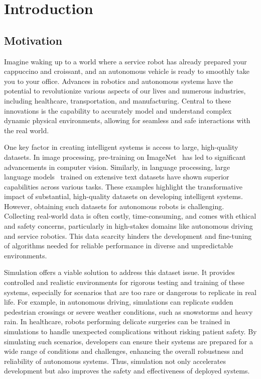 \chapter{Introduction}

\section{Motivation}

Imagine waking up to a world where a service robot has already prepared your cappuccino and croissant, and an autonomous vehicle is ready to smoothly take you to your office. Advances in robotics and autonomous systems have the potential to revolutionize various aspects of our lives and numerous industries, including healthcare, transportation, and manufacturing. Central to these innovations is the capability to accurately model and understand complex dynamic physical environments, allowing for seamless and safe interactions with the real world.

One key factor in creating intelligent systems is access to large, high-quality datasets. In image processing, pre-training on ImageNet~\cite{deng2009imagenet} has led to significant advancements in computer vision. Similarly, in language processing, large language models~\cite{radford2018improving} trained on extensive text datasets have shown superior capabilities across various tasks. These examples highlight the transformative impact of substantial, high-quality datasets on developing intelligent systems. However, obtaining such datasets for autonomous robots is challenging. Collecting real-world data is often costly, time-consuming, and comes with ethical and safety concerns, particularly in high-stakes domains like autonomous driving and service robotics. This data scarcity hinders the development and fine-tuning of algorithms needed for reliable performance in diverse and unpredictable environments.

Simulation offers a viable solution to address this dataset issue. It provides controlled and realistic environments for rigorous testing and training of these systems, especially for scenarios that are too rare or dangerous to replicate in real life. For example, in autonomous driving, simulations can replicate sudden pedestrian crossings or severe weather conditions, such as snowstorms and heavy rain. In healthcare, robots performing delicate surgeries can be trained in simulations to handle unexpected complications without risking patient safety. By simulating such scenarios, developers can ensure their systems are prepared for a wide range of conditions and challenges, enhancing the overall robustness and reliability of autonomous systems. Thus, simulation not only accelerates development but also improves the safety and effectiveness of deployed systems.

